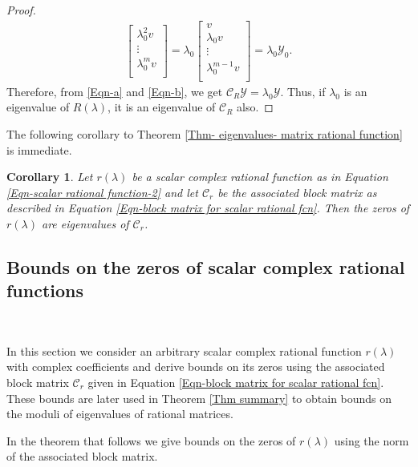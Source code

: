 \documentclass[12pt, reqno]{amsart}
\newtheorem{corollary}[theorem]{Corollary}
\theoremstyle{definition}
\theoremstyle{remark}
\numberwithin{equation}{section}
\begin{document}
\begin{proof}
\begin{align}
\begin{bmatrix}
    \lambda_0^2v\\
    \vdots\\
    \lambda_0^mv\\
\end{bmatrix}
=\lambda_0 \begin{bmatrix}
    v\\
    \lambda_0v\\
    \vdots\\
    \lambda_0^{m-1}v\\
\end{bmatrix}=\lambda_0\mathcal{Y}_0 \label{Eqn-b}.
\end{align}
Therefore, from \eqref{Eqn-a} and \eqref{Eqn-b}, we get $\mathcal{C}_R \mathcal{Y} 
= \lambda_0 \mathcal{Y}$. Thus, if $\lambda_0$ is an eigenvalue of $R(\lambda)$, it 
is an eigenvalue of $\mathcal{C}_R$ also.

\end{proof}


\noindent
The following corollary to Theorem \ref{Thm- eigenvalues- matrix rational function} 
is immediate.

\begin{corollary}\label{Cor-zeros of rational function}
Let $r(\lambda)$ be a scalar complex rational function as in Equation 
\eqref{Eqn-scalar rational function-2} and let $\mathcal{C}_r$ be the associated 
block matrix as described in Equation \eqref{Eqn-block matrix for scalar rational fcn}. 
Then the zeros of $r(\lambda)$ are eigenvalues of $\mathcal{C}_r$.
\end{corollary}


\subsection{Bounds on the zeros of scalar complex rational functions}\label{sec-3.2}

\

In this section we consider an arbitrary scalar complex rational function 
$r(\lambda)$ with complex coefficients and derive  bounds on its zeros using the 
associated block matrix $\mathcal{C}_r$ given in Equation \eqref{Eqn-block matrix 
for scalar rational fcn}. These bounds are later used in Theorem \ref{Thm summary} 
to obtain bounds on the moduli of eigenvalues of rational matrices.

\medskip
\noindent
In the theorem that follows we give bounds on the zeros of $r(\lambda)$ using the 
norm of the associated block matrix.
\end{document}
